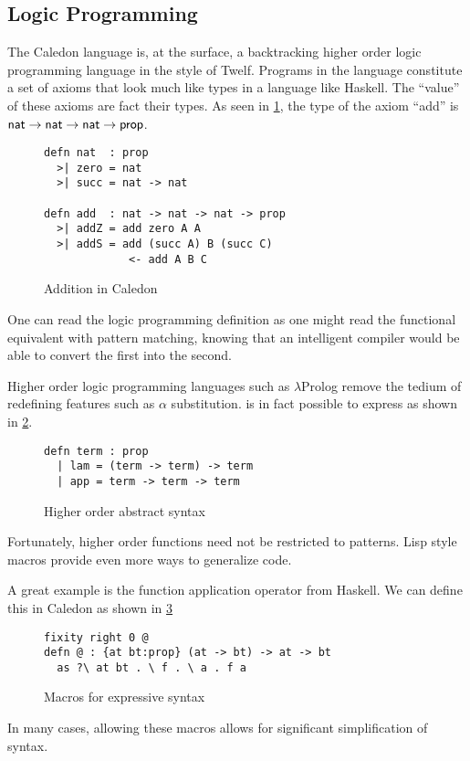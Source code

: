 \subsection{Logic Programming}

The Caledon language is, at the surface, a backtracking higher order logic programming language in the style of Twelf.  
Programs in the language constitute a set of axioms that look much like types in a language like Haskell.  The ``value'' of these axioms are fact 
their types. As seen in \ref{code:add}, the type of the axiom ``add'' is $\mathsf{nat} \rightarrow \mathsf{nat} \rightarrow \mathsf{nat} \rightarrow \mathsf{prop}$. 

\begin{figure}[H]
\begin{lstlisting}
defn nat  : prop 
  >| zero = nat
  >| succ = nat -> nat

defn add  : nat -> nat -> nat -> prop
  >| addZ = add zero A A
  >| addS = add (succ A) B (succ C) 
             <- add A B C
\end{lstlisting}
\caption{Addition in Caledon}
\label{code:add}
\end{figure}

One can read the logic programming definition as one might read the functional equivalent with pattern
matching, knowing that an intelligent compiler would be able to convert the first into the second.  

Higher order logic programming languages such as $\lambda$Prolog remove the tedium of redefining features such as $\alpha$ substitution.
is in fact possible to express as shown in \ref{code:lprolog}.

\begin{figure}[H]
\begin{lstlisting}
defn term : prop
  | lam = (term -> term) -> term
  | app = term -> term -> term
\end{lstlisting}
\caption{Higher order abstract syntax}
\label{code:lprolog}
\end{figure}

Fortunately, higher order functions need not be restricted to patterns.  Lisp style macros provide even more ways
to generalize code.  

A great example is the function application operator from Haskell.  
We can define this in Caledon as shown in \ref{code:macros}

\begin{figure}[H]
\begin{lstlisting}
fixity right 0 @
defn @ : {at bt:prop} (at -> bt) -> at -> bt
  as ?\ at bt . \ f . \ a . f a

\end{lstlisting}
\caption{Macros for expressive syntax}
\label{code:macros}
\end{figure}

In many cases, allowing these macros allows for significant simplification of syntax.
